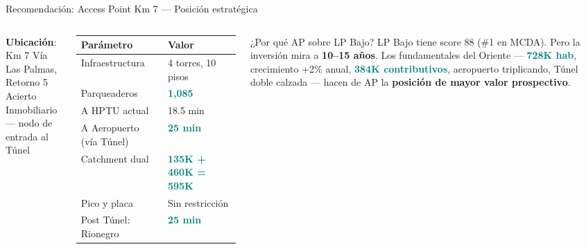 \documentclass[aspectratio=169, 11pt]{beamer}
\newcommand{\highlight}[1]{\textcolor{teal}{\textbf{#1}}}
\begin{document}
{
\begin{frame}{Recomendación: Access Point Km 7 --- Posición estratégica}

\begin{columns}[T]
\textbf{Ubicación}: Km 7 Vía Las Palmas, Retorno 5\\
{\footnotesize Acierto Inmobiliario --- nodo de entrada al Túnel}

\vspace{6pt}

{\footnotesize
\begin{tabular}{@{}p{3.8cm}l@{}}
\toprule
\textbf{Parámetro} & \textbf{Valor} \\
\midrule
Infraestructura & 4 torres, 10 pisos \\
Parqueaderos & \highlight{1,085} \\
A HPTU actual & 18.5 min \\
A Aeropuerto (vía Túnel) & \highlight{25 min} \\
Catchment dual & \highlight{135K + 460K = 595K} \\
Pico y placa & Sin restricción \\
Post Túnel: Rionegro & \highlight{25 min} \\
\bottomrule
\end{tabular}
}

\vspace{6pt}
\begin{exampleblock}{\small ¿Por qué AP sobre LP Bajo?}
\scriptsize LP Bajo tiene score 88 (\#1 en MCDA). Pero la inversión mira a \textbf{10--15 años}. Los fundamentales del Oriente --- \highlight{728K hab}, crecimiento +2\% anual, \highlight{384K contributivos}, aeropuerto triplicando, Túnel doble calzada --- hacen de AP la \textbf{posición de mayor valor prospectivo}.
\end{exampleblock}
\end{columns}
\end{frame}
}
\end{document}
